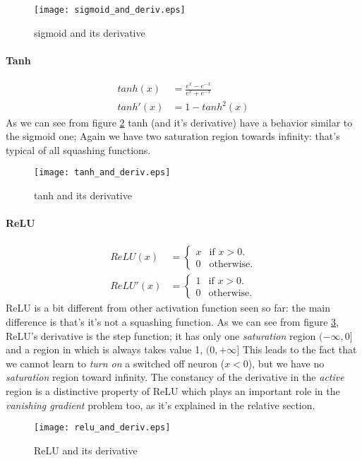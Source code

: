 \begin{figure}[ht]
  \centering
    \texttt{[image: sigmoid\_and\_deriv.eps]}
  \caption{sigmoid and its derivative}
\label{sigmoid_plot}
\end{figure}

\paragraph{Tanh}
\begin{align}
 tanh(x)&=\frac{e^x-e^{-x}}{e^x+e^{-x}} \\
 tanh'(x)&= 1 - tanh^2(x)  
\end{align}
As we can see from figure \ref{tanh_plot} tanh (and it's derivative) have a behavior similar to the sigmoid one; Again we have two saturation region towards
infinity: that's typical of all squashing functions.



\begin{figure}[ht]
  \centering
    \texttt{[image: tanh\_and\_deriv.eps]}
  \caption{tanh and its derivative}
\label{tanh_plot}
\end{figure}



\paragraph{ReLU}


\begin{align}
  ReLU(x)&=\begin{cases}
    x & \text{if $x>0$}.\\
    0 & \text{otherwise}.
  \end{cases} \\ 
   ReLU'(x)&=\begin{cases}
    1 & \text{if $x>0$}.\\
    0 & \text{otherwise}.
  \end{cases}
\end{align}
ReLU is a bit different from other activation function seen so far: the main difference is that's it's not a squashing function.
As we can see from figure \ref{relu_plot}, ReLU's derivative is the step function; it has only one \textit{saturation} region $(-\infty, 0]$ and a region in which is always takes value 1, $(0,+\infty]$
This leads to the fact that we cannot learn to \textit{turn on} a switched off neuron ($x<0$), but we have no \textit{saturation} region toward infinity.
The constancy of the derivative in the \textit{active} region is a distinctive property of ReLU which plays an important role in the \textit{vanishing gradient} problem too, as it's explained in the relative
section.

\begin{figure}[ht]
  \centering
    \texttt{[image: relu\_and\_deriv.eps]}
  \caption{ReLU and its derivative}
\label{relu_plot}
\end{figure}
